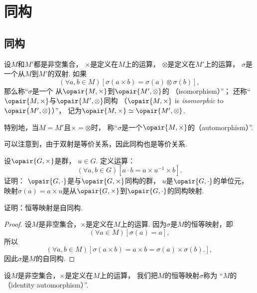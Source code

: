 \section{同构}
\subsection{同构}
\begin{definition}
设\(M\)和\(M'\)都是非空集合，
\(\times\)是定义在\(M\)上的运算，
\(\otimes\)是定义在\(M'\)上的运算，
\(\sigma\)是一个从\(M\)到\(M'\)的双射.
如果\[
	(\forall a,b \in M)[\sigma(a \times b) = \sigma(a) \otimes \sigma(b)],
\]
那么称“\(\sigma\)是一个%
从\(\opair{M,\times}\)到\(\opair{M',\otimes}\)的%
（isomorphism）”；
还称“\(\opair{M,\times}\)与\(\opair{M',\otimes}\)同构%
（\(\opair{M,\times}\) is \emph{isomorphic} to \(\opair{M',\otimes}\)）”，
记为\(\opair{M,\times} \simeq \opair{M',\otimes}\).

特别地，当\(M=M'\)且\(\times=\otimes\)时，
称“\(\sigma\)是一个\(\opair{M,\times}\)的（automorphism）”.
\end{definition}

可以注意到，由于双射是等价关系，因此同构也是等价关系.

\begin{example}
设\(\opair{G,\times}\)是群，
\(u\in G\).
定义运算：\[
	(\forall a,b\in G)[
		a \cdot b
		= a \times u^{-1} \times b
	].
\]
证明：
\(\opair{G,\cdot}\)是与\(\opair{G,\times}\)同构的群，
\(u\)是\(\opair{G,\cdot}\)的单位元，
映射\(\sigma(a) = a \times u\)是从\(\opair{G,\times}\)到\(\opair{G,\cdot}\)的同构映射.
\end{example}

\begin{example}\label{example:抽象代数.恒等映射是自同构}
证明：恒等映射是自同构.
\begin{proof}
设\(M\)是非空集合，\(\times\)是定义在\(M\)上的运算.
因为\(\sigma\)是\(M\)的恒等映射，即\[
	(\forall a\in M)[\sigma(a) = a],
\]
所以\[
	(\forall a,b\in M)[
		\sigma(a \times b) = a \times b = \sigma(a) \times \sigma(b).
	],
\]
因此\(\sigma\)是\(M\)的自同构.
\end{proof}
\end{example}

\begin{definition}
设\(M\)是非空集合，\(\times\)是定义在\(M\)上的运算，
我们把\(M\)的恒等映射\(\sigma\)称为
“\(M\)的（identity automorphism）”.
\end{definition}

